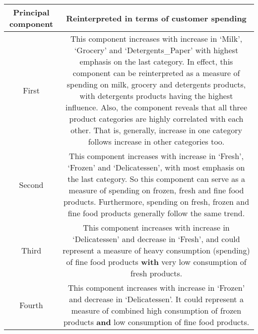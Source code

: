 \documentclass{article}
\begin{document}
\begin{longtable}[c]{@{}cc@{}}
\toprule
\begin{minipage}[b]{0.26\columnwidth}\centering\strut
Principal component
\strut\end{minipage} &
\begin{minipage}[b]{0.57\columnwidth}\centering\strut
Reinterpreted in terms of customer spending
\strut\end{minipage}\tabularnewline
\midrule
\endhead
\begin{minipage}[t]{0.26\columnwidth}\centering\strut
First
\strut\end{minipage} &
\begin{minipage}[t]{0.57\columnwidth}\centering\strut
This component increases with increase in `Milk', `Grocery' and
`Detergents\_Paper' with highest emphasis on the last category. In
effect, this component can be reinterpreted as a measure of spending on
milk, grocery and detergents products, with detergents products having
the highest influence. Also, the component reveals that all three
product categories are highly correlated with each other. That is,
generally, increase in one category follows increase in other categories
too.
\strut\end{minipage}\tabularnewline
\begin{minipage}[t]{0.26\columnwidth}\centering\strut
Second
\strut\end{minipage} &
\begin{minipage}[t]{0.57\columnwidth}\centering\strut
This component increases with increase in `Fresh', `Frozen' and
`Delicatessen', with most emphasis on the last category. So this
component can serve as a measure of spending on frozen, fresh and fine
food products. Furthermore, spending on fresh, frozen and fine food
products generally follow the same trend.
\strut\end{minipage}\tabularnewline
\begin{minipage}[t]{0.26\columnwidth}\centering\strut
Third
\strut\end{minipage} &
\begin{minipage}[t]{0.57\columnwidth}\centering\strut
This component increases with increase in `Delicatessen' and decrease in
`Fresh', and could represent a measure of heavy consumption (spending)
of fine food products \textbf{with} very low consumption of fresh
products.
\strut\end{minipage}\tabularnewline
\begin{minipage}[t]{0.26\columnwidth}\centering\strut
Fourth
\strut\end{minipage} &
\begin{minipage}[t]{0.57\columnwidth}\centering\strut
This component increases with increase in `Frozen' and decrease in
`Delicatessen'. It could represent a measure of combined high
consumption of frozen products \textbf{and} low consumption of fine food
products.
\strut\end{minipage}\tabularnewline
\bottomrule
\end{longtable}
\end{document}
